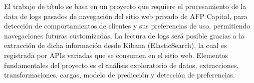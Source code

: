 El trabajo de título se basa en un proyecto que requiere el procesamiento de la data de logs pasados de navegación del sitio web privado de AFP Capital, para detección de comportamientos de clientes y sus preferencias de uso, permitiendo navegaciones futuras customizadas. La lectura de logs será posible gracias a la extracción de dicha información desde Kibana (ElasticSearch), la cual es registrada por APIs variadas que se consumen en el sitio web. Elementos fundamentales del proyecto es el análisis exploratorio de datos, extracciones, transformaciones, cargas, modelo de predicción y detección de preferencias. 